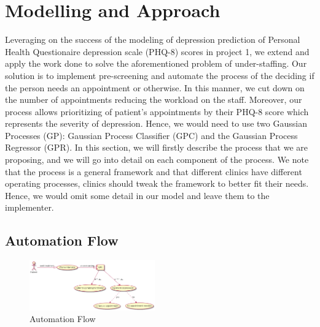 \documentclass{article}
\begin{document}
	\section{Modelling and Approach}
	Leveraging on the success of the modeling of depression prediction of Personal Health Questionaire depression scale (PHQ-8) scores in project 1, we extend and apply the work done to solve the aforementioned problem of under-staffing.
    Our solution is to implement pre-screening and automate the process of the deciding if the person needs an appointment or otherwise.
    In this manner, we cut down on the number of appointments reducing the workload on the staff. 
    Moreover, our process allows prioritizing of patient's appointments by their PHQ-8 score which represents the severity of depression.
    Hence, we would need to use two Gaussian Processes (GP): Gaussian Process Classifier (GPC) and the Gaussian Process Regressor (GPR). 
    In this section, we will firstly describe the process that we are proposing, and we will go into detail on each component of the process. 
    We note that the process is a general framework and that different clinics have different operating processes, clinics should tweak the framework to better fit their needs. 
    Hence, we would omit some detail in our model and leave them to the implementer.

	\subsection{Automation Flow} \label{af}
	\begin{figure}[h]
 		\begin{center}
		\includegraphics[width=0.48\textwidth]{automation} 
  		\end{center}
  		\caption{Automation Flow}
  		\label{auto_flow} 
 	\end{figure}

\end{document}
